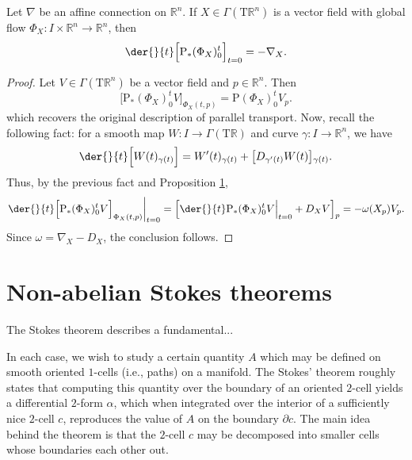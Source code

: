 \begin{theorem}
  Let $\nabla$ be an affine connection on $\mathbb{R}^n$. If $X \in \Gamma(\mathrm{T}\mathbb{R}^n)$ is a vector field with global flow $\Phi_X \colon I \times \mathbb{R}^n \to \mathbb{R}^n$, then
  \begin{equation}
    \der{}{t} \Big[ \mathrm{P}_\ast(\Phi_X)_{0}^{t}
    \Big]_{t=0} = -\nabla_X. 
  \end{equation}
\end{theorem}
\begin{proof}
Let $V \in \Gamma(\mathrm{T}\mathbb{R}^n)$ be a vector field and $p \in \mathbb{R}^n$. Then 
\begin{equation}
   \Big[\mathrm{P}_*(\Phi_X)_{0}^{t} V\Big]_{\Phi_X(t, p)} = \mathrm{P}(\Phi_X)_{0}^{t} V_p.
\end{equation}
which recovers the original  description of parallel transport. Now, recall the following fact: for a smooth map $W \colon I \to \Gamma(\mathrm{T}\mathbb{R})$ and curve $\gamma \colon I \to \mathbb{R}^n$, we have
\begin{equation}
  \der{}{t} \Big[W(t)_{\gamma(t)}\Big] = W'(t)_{\gamma(t)} + \big[D_{\gamma'(t)} W(t)\big]{}_{\gamma(t)}.
\end{equation}
Thus, by the previous fact and Proposition \ref{},
\begin{equation}
  \left.\der{}{t}\Big[\mathrm{P}_*(\Phi_X)_{0}^{t} V\Big]_{\Phi_X(t, p)}\right|_{t = 0} = \left[\der{}{t} \mathrm{P}_*(\Phi_X)_{0}^{t} V\Big|_{t = 0} + D_{X} V \right]_{\raisebox{2pt}{$\scriptstyle p$}} = -\omega(X_p)V_p.
\end{equation}
Since $\omega = \nabla_X - D_X$, the conclusion follows.
\end{proof}


\section{Non-abelian Stokes theorems}

The Stokes theorem describes a fundamental...


In each case, we wish to study a certain  quantity $A$ which may be defined on smooth oriented $1$-cells (i.e., paths) on a manifold. The Stokes' theorem roughly states that computing this quantity over the boundary of an  oriented $2$-cell yields a differential $2$-form $\alpha$, which when integrated over the interior of a sufficiently nice $2$-cell $c$, reproduces the value of $A$ on the boundary $\partial c$. The main idea behind the theorem is that the $2$-cell $c$ may be decomposed into smaller cells whose boundaries  each other out.

